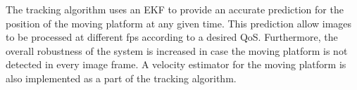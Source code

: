 \documentclass[conference]{IEEEtran}
\begin{document}
%
%
%
%

The tracking algorithm uses an EKF to provide an accurate
prediction for the position of the moving platform at any given
time. This prediction allow images to be processed at different fps
according to a desired QoS. Furthermore, the overall robustness of the
system is increased in case the moving platform is not detected in
every image frame. A velocity estimator for the moving platform is
also implemented as a part of the tracking algorithm.


%
\end{document}
